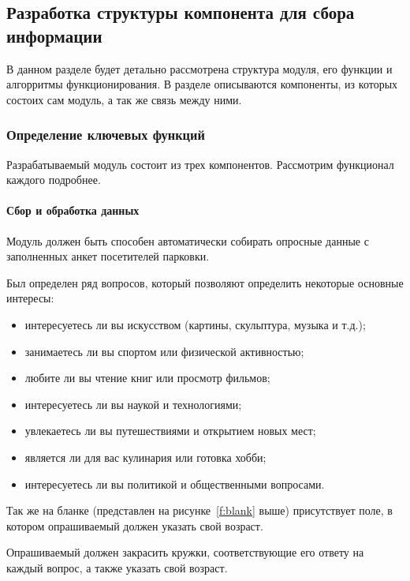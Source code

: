 

\subsection{Разработка структуры компонента для сбора информации}

В данном разделе будет детально рассмотрена структура модуля, его функции и алгорритмы функционирования. В разделе описываются компоненты, из которых состоих сам модуль, а так же связь между ними.


\subsubsection{Определение ключевых функций}

Разрабатываемый модуль состоит из трех компонентов. Рассмотрим функционал каждого подробнее.

\paragraph{Сбор и обработка данных}

Модуль должен быть способен автоматически собирать опросные данные с заполненных анкет посетителей парковки.

Был определен ряд вопросов, который позволяют определить некоторые основные интересы:
\begin{itemize}
    \item ­интересуетесь ли вы искусством (картины, скульптура, музыка и т.д.);
    \item ­занимаетесь ли вы спортом или физической активностью;
    \item ­любите ли вы чтение книг или просмотр фильмов;
    \item ­интересуетесь ли вы наукой и технологиями;
    \item ­увлекаетесь ли вы путешествиями и открытием новых мест;
    \item ­является ли для вас кулинария или готовка хобби;
    \item ­интересуетесь ли вы политикой и общественными вопросами.
\end{itemize}

Так же на бланке (представлен на рисунке~\ref{f:blank} выше) присутствует поле, в котором опрашиваемый должен указать свой возраст. 

Опрашиваемый должен закрасить кружки, соответствующие его ответу на каждый вопрос, а также указать свой возраст.

